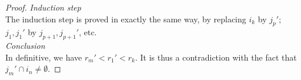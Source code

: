 \documentclass[12pt]{article}
\begin{document}
\begin{proof}
    \textit{Induction step}\\
    The induction step is proved in exactly the same way, by replacing $i_k$ by $j_p'$; $j_1, j_1'$ by $j_{p+1}, j_{p+1}'$, etc.\\
    
    \textit{Conclusion}\\
    In definitive, we have $r_m' < r_1' < r_k$. It is thus a contradiction with the fact that $j_m' \cap i_n \ne \emptyset$.

\end{proof}
\end{document}
